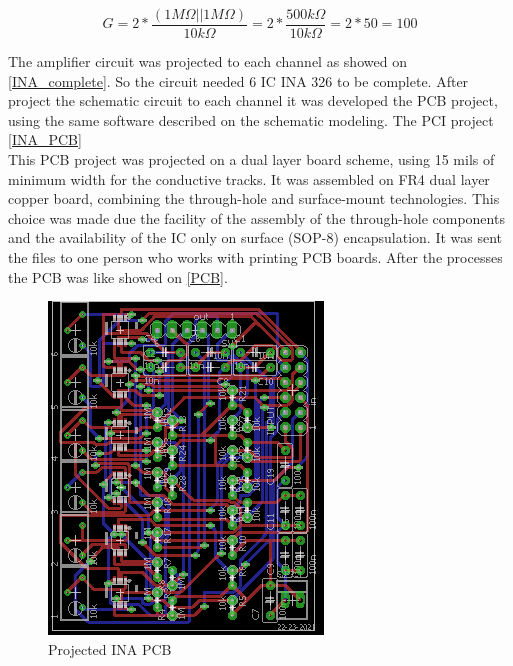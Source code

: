 \begin{equation}
  \label{Gain}
G=2*\frac{(1M\Omega||1M\Omega)}{10k\Omega}
=2*\frac{500k\Omega}{10k\Omega}
=2*50
=100
\end{equation}

The amplifier circuit was projected to each channel as showed on \autoref{INA_complete}.
So the circuit needed 6 IC INA 326 to be complete.  After project
the schematic circuit to each channel it was developed the PCB project, using the
same software described on the schematic modeling. The PCI project \autoref{INA_PCB}\\

This PCB project was projected on a dual layer board scheme, using 15 mils of
minimum width for the conductive tracks. It was assembled on FR4 dual layer copper
board, combining the through-hole and surface-mount technologies. This choice was
made due the facility of the assembly of the through-hole components and the availability
of the IC only on surface (SOP-8) encapsulation. It was sent
the files to one person who works with printing PCB boards. After the processes
the PCB was like showed on \autoref{PCB}.\\

\begin{figure}[!htpb]
\centering
\caption{Projected INA PCB}
\label{INA_PCB}
\includegraphics[scale=1.8]{images/TCC_INA}
\end{figure}


